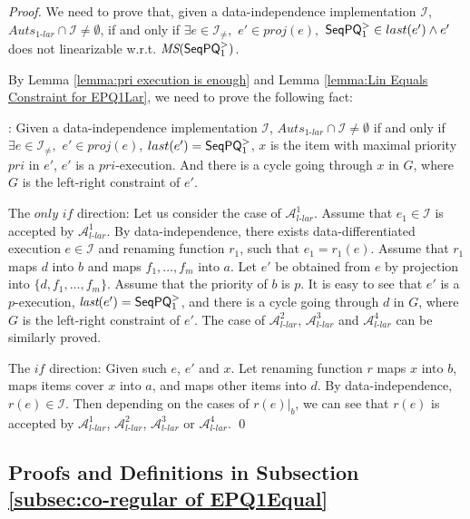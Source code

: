 \begin {proof}

We need to prove that, given a data-independence implementation $\mathcal{I}$, $\textit{Auts}_{\textit{1-lar}} \cap \mathcal{I} \neq \emptyset$, if and only if $\exists e \in \mathcal{I}_{\neq},$ $e' \in \textit{proj}(e),$ $\mathsf{SeqPQ}_1^{>} \in last(e') \wedge e'$ does not linearizable w.r.t. $\textit{MS}(\mathsf{SeqPQ}_1^{>})$.

By Lemma \ref{lemma:pri execution is enough} and Lemma \ref{lemma:Lin Equals Constraint for EPQ1Lar}, we need to prove the following fact:

: Given a data-independence implementation $\mathcal{I}$, $\textit{Auts}_{\textit{1-lar}} \cap \mathcal{I} \neq \emptyset$ if and only if $\exists e \in \mathcal{I}_{\neq},$ $e' \in \textit{proj}(e)$, $last(e')=\mathsf{SeqPQ}_1^{>}$, $x$ is the item with maximal priority $\textit{pri}$ in $e'$, $e'$ is a $\textit{pri}$-execution. And there is a cycle going through $x$ in $G$, where $G$ is the left-right constraint of $e'$.

\noindent The $\textit{only if}$ direction: Let us consider the case of $\mathcal{A}_{\textit{l-lar}}^1$. Assume that $e_1 \in \mathcal{I}$ is accepted by $\mathcal{A}_{\textit{l-lar}}^1$. By data-independence, there exists data-differentiated execution $e \in \mathcal{I}$ and renaming function $r_1$, such that $e_1 = r_1(e)$. Assume that $r_1$ maps $d$ into $b$ and maps $f_1,\ldots,f_m$ into $a$. Let $e'$ be obtained from $e$ by projection into $\{ d, f_1,\ldots,f_m \}$. Assume that the priority of $b$ is $p$. It is easy to see that $e'$ is a $p$-execution, $\textit{last}(e') = \mathsf{SeqPQ}_1^{>}$, and there is a cycle going through $d$ in $G$, where $G$ is the left-right constraint of $e'$. The case of $\mathcal{A}_{\textit{l-lar}}^2$, $\mathcal{A}_{\textit{l-lar}}^3$ and $\mathcal{A}_{\textit{l-lar}}^4$ can be similarly proved.

\noindent The $\textit{if}$ direction: Given such $e$, $e'$ and $x$. Let renaming function $r$ maps $x$ into $b$, maps items cover $x$ into $a$, and maps other items into $d$. By data-independence, $r(e) \in \mathcal{I}$. Then depending on the cases of $r(e) \vert_{b}$, we can see that $r(e)$ is accepted by $\mathcal{A}_{\textit{l-lar}}^1$, $\mathcal{A}_{\textit{l-lar}}^2$, $\mathcal{A}_{\textit{l-lar}}^3$ or $\mathcal{A}_{\textit{l-lar}}^4$. \qed
\end {proof}



\subsection{Proofs and Definitions in Subsection \ref{subsec:co-regular of EPQ1Equal}}
\label{sec:appendix proof and definition in section co-regular of EPQ1Equal}


